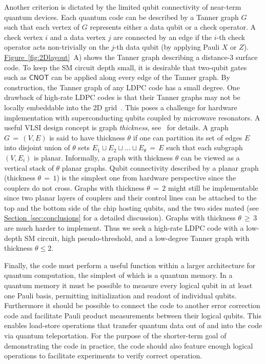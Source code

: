 \documentclass{article}
\newcommand{\Gate}[1]{\mathsf{#1}}
\newcommand{\cnotgate}{\Gate{CNOT}}
\renewcommand{\sec}[1]{\hyperref[sec:#1]{Section~\ref*{sec:#1}}}
\newcommand{\fig}[1]{\hyperref[fig:#1]{Figure~\ref*{fig:#1}}}
\begin{document}
Another criterion is dictated by the limited qubit connectivity of near-term quantum devices.
Each quantum code can be described by a Tanner graph $G$ such that 
each vertex of $G$ represents either a data qubit or a check operator. 
A check vertex  $i$
and a data vertex $j$ are connected by an edge if the $i$-th check operator
acts non-trivially  
on the $j$-th data qubit (by applying Pauli $X$ or $Z$). \fig{2Dlayout}~A) shows the Tanner graph describing a distance-3 surface code. 
To keep the SM circuit depth small, it is desirable that two-qubit gates such as $\cnotgate$ can be applied along every edge of the Tanner graph. By construction, the Tanner graph of any LDPC code
has a small degree. 
One drawback of high-rate LDPC codes is that their Tanner graphs may not be locally embeddable 
into the 2D grid~\cite{baspin2022quantifying,bravyi2010tradeoffs}. This poses a challenge
for hardware implementation with superconducting qubits
coupled by   microwave resonators.
A useful VLSI design concept is graph {\em thickness},  see~\cite{mutzel1998thickness,tremblay2022constant} for details.
A graph $G\,{=}\,(V,E)$ is said to have thickness $\theta$ if one can partition its set of edges $E$ into disjoint union of $\theta$ sets 
$E_1\sqcup E_2\sqcup\ldots \sqcup E_\theta\,{=}\,E$ such that each subgraph $(V,E_i)$ is planar.
Informally, a graph with thickness $\theta$ can be viewed as a vertical stack of $\theta$ planar graphs.
Qubit connectivity described by a planar graph (thickness $\theta\,{=}\,1$) is the simplest one from hardware
perspective since the couplers do not cross. Graphs with thickness $\theta\,{=}\,2$ might still be implementable since two planar layers of couplers and their control lines can be attached to the top and the bottom side of the chip hosting qubits, and the two sides mated (see \sec{conclusions} for a detailed discussion).
Graphs with thickness $\theta\,{\ge}\, 3$ are much harder to implement. Thus we seek a high-rate LDPC code with a low-depth %
SM circuit, high pseudo-threshold, and a low-degree Tanner graph with thickness $\theta\le 2$.

Finally, the code must perform a useful function within a larger architecture for quantum computation, the simplest of which is a quantum memory. In a quantum memory it must be possible to measure every logical qubit in at least one Pauli basis, permitting initialization and readout of individual qubits. Furthermore it should be possible to connect the code to another error correction code and facilitate Pauli product measurements between their logical qubits. This enables load-store operations that transfer quantum data out of and into the code via quantum teleportation. For the purpose of the shorter-term goal of demonstrating the code in practice, the code should also feature enough logical operations to facilitate experiments to verify correct operation.
\end{document}

